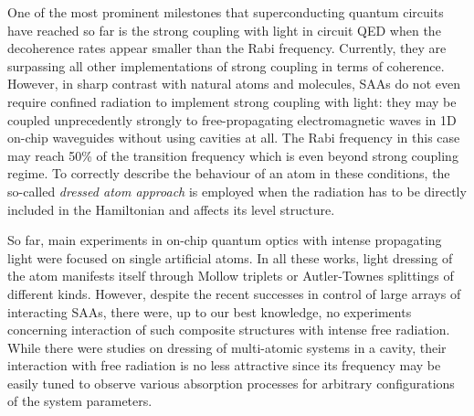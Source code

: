 \documentclass[%
 pra,
 amsmath,amssymb,
 reprint,%
]{revtex4-1}
\begin{document}
One of the most prominent milestones that 
superconducting quantum circuits have reached so 
far is the strong coupling with light in {circuit 
QED}\cite{wallraff2004strong, 
chiorescu2004coherent} when the decoherence rates 
appear smaller than the Rabi frequency. 
Currently, they are surpassing all other 
implementations of strong coupling in terms of 
coherence\cite{forn2019ultrastrong}. 
However, in sharp contrast with natural atoms and 
molecules, SAAs do not even require confined 
radiation to implement strong coupling with 
light: they may be coupled unprecedently strongly 
to free-propagating electromagnetic waves in 1D 
on-chip waveguides\cite{astafiev2010resonance} 
without using cavities at all. The Rabi frequency 
in this case may reach 50\% of the transition 
frequency\cite{deng2015observation} which is even 
beyond strong coupling 
regime\cite{forn2019ultrastrong}. To correctly 
describe the behaviour of an atom in these 
conditions, the so-called \textit{dressed atom 
approach}\cite{cohen1998atom} is employed when 
the radiation has to be directly included in the 
Hamiltonian and affects its level structure.

So far, main experiments in on-chip quantum 
optics with intense propagating light were 
focused on single artificial 
atoms\cite{baur2009measurement, 
sillanpaa2009autler, astafiev2010resonance, 
novikov2013autler, suri2013observation, 
koshino2013observation, 
braumuller2015multiphoton, peng2018vacuum, 
gasparinetti2019two}. In all these works, light 
dressing of the atom manifests itself through 
Mollow triplets or Autler-Townes splittings of 
different kinds. However, despite the recent 
successes in control of large arrays of 
interacting SAAs\cite{Song574, ye2019propagation, 
arute2019quantum}, there were, up to our best 
knowledge, no experiments concerning interaction 
of such composite structures with intense free 
radiation. While there were studies on dressing 
of multi-atomic systems in a 
cavity\cite{fink2009dressed, 
macha2014implementation, shulga2017observation, 
yang2018probing}, their interaction with free 
radiation is no less attractive since its 
frequency may be easily tuned to observe various 
absorption processes for arbitrary configurations 
of the system parameters.
\end{document}
